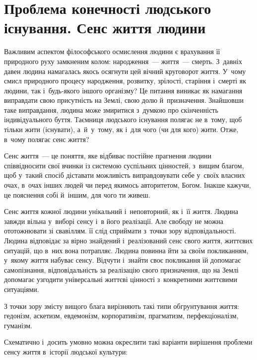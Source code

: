 \documentclass[a5paper,oneside,DIV=12,12pt,headings=small]{scrartcl}
\begin{document}
	\tableofcontents
	
	\setcounter{section}{30} %
	\section{Проблема конечності людського існування. Сенс життя людини}
		Важливим аспектом філософського осмислення людини є врахування її природного руху замкненим колом: народження~— життя~— смерть. З~давніх давен людина намагалась якось осягнути цей вічний круговорот життя. У~чому смисл природного процесу народження, розвитку, зрілості, старіння і~смерті як людини, так і~будь-якого іншого організму? Це питання виникає як намагання виправдати свою присутність на Землі, свою долю й~призначення. Знайшовши таке виправдання, людина може змиритися з~думкою про скінченність індивідуального буття. Таємниця людського існування полягає не в~тому, щоб тільки жити (існувати), а~й~у~тому, як і~для чого (чи для кого) жити. Отже, в~чому полягає сенс життя?

		Сенс життя~— це поняття, яке відбиває постійне прагнення людини співвідносити свої вчинки із системою суспільних цінностей, з~вищим благом, щоб у~такий спосіб діставати можливість виправдовувати себе у~своїх власних очах, в~очах інших людей чи перед якимось авторитетом, Богом. Інакше кажучи, це пояснення собі й~іншим, для чого ти живеш.

		Сенс життя кожної людини унікальний і~неповторний, як і~її життя. Людина завжди вільна у~виборі сенсу і~в його реалізації. Але свободу не можна ототожнювати зі свавіллям. її слід сприймати з~точки зору відповідальності. Людина відповідає за вірно знайдений і~реалізований сенс свого життя, життєвих ситуацій, що в~них вона потрапляє. Людина повинна йти за своїм покликанням, у~якому життя набуває сенсу. Відчути і~знайти своє покликання їй допомагає самопізнання, відповідальність за реалізацію свого призначення, що на Землі допомагає узгодити універсальні життєві цінності з~конкретними життєвими ситуаціями.

		З точки зору змісту вищого блага вирізняють такі типи обгрунтування життя: гедонізм, аскетизм, евдемонізм, корпоративізм, прагматизм, перфекціоналізм, гуманізм.

		Схематично і~досить умовно можна окреслити такі варіанти вирішення проблеми сенсу життя в~історії людської культури:
\end{document}
